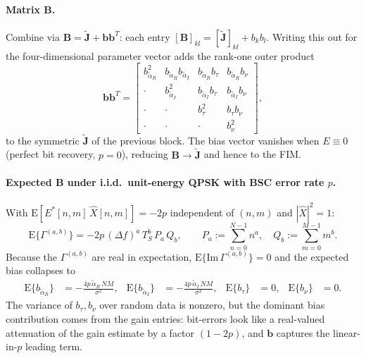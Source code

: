 \documentclass[11pt]{article}
\begin{document}
\paragraph{Matrix \(\bm{B}\).} Combine via \(\bm{B} = \tilde{\bm{J}} + \bm{b}\bm{b}^T\): each entry \([\bm{B}]_{kl} = [\tilde{\bm{J}}]_{kl} + b_k b_l\). Writing this out for the four-dimensional parameter vector adds the rank-one outer product
\begin{equation}
    \bm{b}\bm{b}^T = \begin{bmatrix} b_{\tilde{\alpha}_R}^2 & b_{\tilde{\alpha}_R} b_{\tilde{\alpha}_I} & b_{\tilde{\alpha}_R} b_\tau & b_{\tilde{\alpha}_R} b_\nu \\
        \cdot & b_{\tilde{\alpha}_I}^2 & b_{\tilde{\alpha}_I} b_\tau & b_{\tilde{\alpha}_I} b_\nu \\
        \cdot & \cdot & b_\tau^2 & b_\tau b_\nu \\
        \cdot & \cdot & \cdot & b_\nu^2 \end{bmatrix},
\end{equation}
to the symmetric \(\tilde{\bm{J}}\) of the previous block. The bias vector vanishes when \(E \equiv 0\) (perfect bit recovery, \(p = 0\)), reducing \(\bm{B} \to \tilde{\bm{J}}\) and hence to the FIM.

\paragraph{Expected \(\bm{B}\) under i.i.d.\ unit-energy QPSK with BSC error rate \(p\).} With \(\mathrm{E}[E^*[n,m]\, \hat{X}[n,m]] = -2p\) independent of \((n,m)\) and \(|\hat{X}|^2 = 1\):
\begin{equation}
    \mathrm{E}\{\Gamma^{(a,b)}\} = -2p\, (\Delta f)^a\, T_S^b\, P_a\, Q_b, \qquad P_a := \sum_{n=0}^{N-1} n^a, \quad Q_b := \sum_{m=0}^{M-1} m^b.
\end{equation}
Because the \(\Gamma^{(a,b)}\) are real in expectation, \(\mathrm{E}\{\mathrm{Im}\,\Gamma^{(a,b)}\} = 0\) and the expected bias collapses to
\begin{align}
    \mathrm{E}\{b_{\tilde{\alpha}_R}\} &= -\tfrac{4p\, \tilde{\alpha}_R\, NM}{\sigma^2}, &
    \mathrm{E}\{b_{\tilde{\alpha}_I}\} &= -\tfrac{4p\, \tilde{\alpha}_I\, NM}{\sigma^2}, &
    \mathrm{E}\{b_\tau\} &= 0, &
    \mathrm{E}\{b_\nu\} &= 0.
\end{align}
The variance of \(b_\tau, b_\nu\) over random data is nonzero, but the dominant bias contribution comes from the gain entries: bit-errors look like a real-valued attenuation of the gain estimate by a factor \((1-2p)\), and \(\bm{b}\) captures the linear-in-\(p\) leading term.
\end{document}
